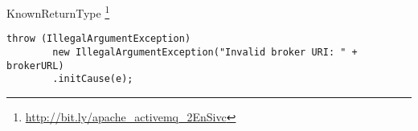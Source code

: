 \begin{pattern}{KnownReturnType}
\footnote{\url{http://bit.ly/apache_activemq_2EnSivc}}

\begin{verbatim}
throw (IllegalArgumentException)
        new IllegalArgumentException("Invalid broker URI: " + brokerURL)
        .initCause(e);
\end{verbatim}

\detection{}

\discussion{}

\related{}

\end{pattern}